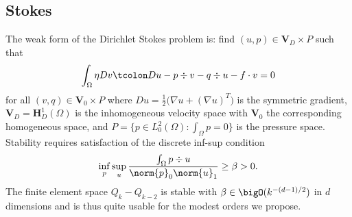 \subsection{Stokes}
The weak form of the Dirichlet Stokes problem is: find $(u,p) \in \bm V_D \times P$ such that
\begin{equation*}
  \int_\Omega \eta Dv \tcolon Du - p \div v - q\div u - f\cdot v = 0
\end{equation*}
for all $(v,q) \in \bm V_0 \times P$ where $Du = \frac 1 2 \big(\nabla u + (\nabla u)^T \big)$ is the symmetric
gradient, $\bm V_D = \bm H^1_D(\Omega)$ is the inhomogeneous velocity space with $\bm V_0$ the corresponding homogeneous
space, and $P = \{p \in L^2_0(\Omega) : \int_\Omega p = 0 \}$ is the pressure space.  Stability requires satisfaction of
the discrete inf-sup condition
\begin{equation*}
  \inf_{p} \sup_{u} \frac{\int_\Omega p \div u}{\norm{p}_{0} \norm{u}_1} \ge \beta > 0 .
\end{equation*}
The finite element space $Q_k-Q_{k-2}$ is stable with $\beta \in \bigO(k^{-(d-1)/2})$ in $d$ dimensions \citep[see][]{schotzau1998mhf} and is thus quite usable for the modest orders we propose.

